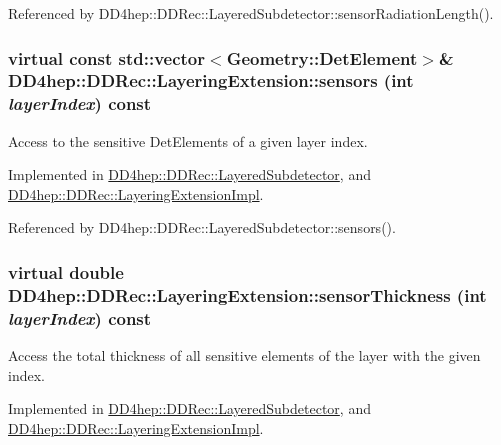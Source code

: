Referenced by DD4hep::DDRec::LayeredSubdetector::sensorRadiationLength().\hypertarget{class_d_d4hep_1_1_d_d_rec_1_1_layering_extension_a832e6f67c9e507b89f8f41d0a5cc0025}{
\subsubsection[{sensors}]{\setlength{\rightskip}{0pt plus 5cm}virtual const std::vector$<${\bf Geometry::DetElement}$>$\& DD4hep::DDRec::LayeringExtension::sensors (int {\em layerIndex}) const}}
\label{class_d_d4hep_1_1_d_d_rec_1_1_layering_extension_a832e6f67c9e507b89f8f41d0a5cc0025}


Access to the sensitive DetElements of a given layer index. 

Implemented in \hyperlink{class_d_d4hep_1_1_d_d_rec_1_1_layered_subdetector_aaa4246ef49e83aa4ab6ec6f2177ddf1c}{DD4hep::DDRec::LayeredSubdetector}, and \hyperlink{class_d_d4hep_1_1_d_d_rec_1_1_layering_extension_impl_a19380a0d054c47913fb3121457cef04d}{DD4hep::DDRec::LayeringExtensionImpl}.

Referenced by DD4hep::DDRec::LayeredSubdetector::sensors().\hypertarget{class_d_d4hep_1_1_d_d_rec_1_1_layering_extension_a06a960f9de84690eb3383f89d1aada13}{
\subsubsection[{sensorThickness}]{\setlength{\rightskip}{0pt plus 5cm}virtual double DD4hep::DDRec::LayeringExtension::sensorThickness (int {\em layerIndex}) const}}
\label{class_d_d4hep_1_1_d_d_rec_1_1_layering_extension_a06a960f9de84690eb3383f89d1aada13}


Access the total thickness of all sensitive elements of the layer with the given index. 

Implemented in \hyperlink{class_d_d4hep_1_1_d_d_rec_1_1_layered_subdetector_aa373ff4546aace1d8049e19b8ef8874f}{DD4hep::DDRec::LayeredSubdetector}, and \hyperlink{class_d_d4hep_1_1_d_d_rec_1_1_layering_extension_impl_adb4ae56a651abfa1758201c6562e2ee0}{DD4hep::DDRec::LayeringExtensionImpl}.

